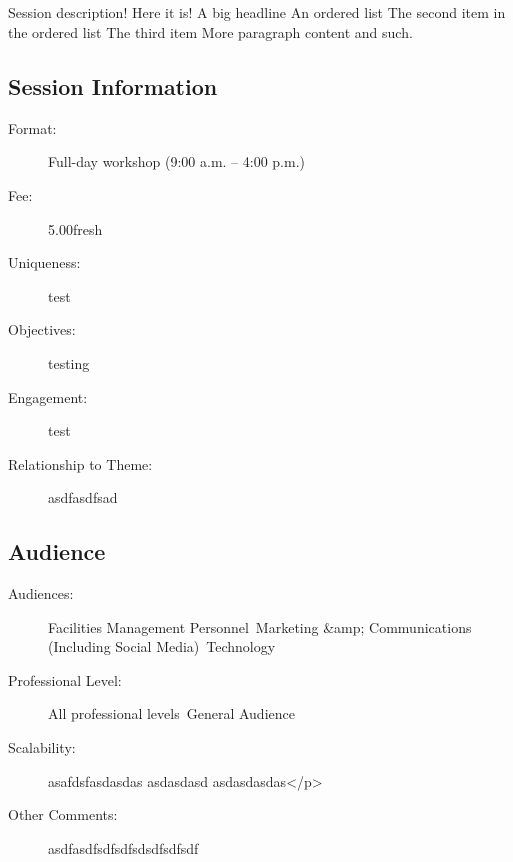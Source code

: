 \documentclass{report}
\begin{document}
              \subsection*{}
                 Session description! Here it is!  A big headline  An ordered list The second item in the ordered list The third item  More paragraph content and such.

              \subsection*{Session Information}
                \begin{description}
                  \item [Format:] Full-day workshop (9:00 a.m. – 4:00 p.m.)
							    
								  \item [Fee:]5.00fresh 
							     
							    \item [Uniqueness:]test
							    \item [Objectives:]testing
							    \item [Engagement:]test
							    \item [Relationship to Theme:]asdfasdfsad
							    
                \end{description}
              \subsection*{Audience}
                \begin{description}
                  \item [Audiences:]Facilities Management Personnel~Marketing &amp; Communications (Including Social Media)~Technology~
                  \item[Professional Level:]All professional levels~General Audience~
                \item[Scalability:] asafdsfasdasdas
asdasdasd
asdasdasdas</p>
							
              \item[Other Comments:] asdfasdfsdfsdfsdsdfsdfsdf
              \end{description}




    
  

  
\end{document}
